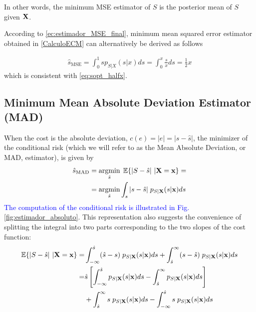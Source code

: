 In other words, the minimum MSE estimator of $S$ is the posterior mean of $S$ given $\bf X$.

\begin{example}
According to \eqref{ec:estimador_MSE_final}, minimum mean squared error estimator obtained in \ref{CalculoECM} can alternatively be derived as follows

\begin{align}
\label{ec:estimador_MSE_final2}
\hat s_{\text{MSE}} = \int_0^1 s p_{S|X}(s|x) ds   
   = \int_0^x \frac{s}{x} ds 
   = \frac{1}{2} x
\end{align}
which is consistent with \eqref{eq:sopt_halfx}.
\end{example}\vspace{0.4cm}



\subsection{Minimum Mean Absolute Deviation Estimator (MAD)}

When the cost is the absolute deviation, $c(e) = |e| = |s - \hat s|$, the minimizer of the conditional risk (which we will refer to as the Mean Absolute Deviation, or MAD, estimator), is given by
\begin{align}
\label{ec:coste_MAD}
\hat{s}_\text{MAD} & = \operatorname*{argmin}_{\hat s}\; \mathbb{E}\{|S - \hat s|~|{\bf X} = {\bf x} \} = \\
	  & = \operatorname*{argmin}_{\hat s}   \int_s |s - \hat s|\;p_{S|{\bf X}}(s|{\bf x}) ds
\end{align}
\textcolor{blue}{The computation of the conditional risk is illustrated in Fig. \ref{fig:estimador_absoluto}}. This representation also suggests the convenience of splitting the integral into two parts corresponding to the two slopes of the cost function:
\begin{align}
\mathbb{E}\{|S - \hat s|~|{\bf X} = {\bf x} \} 
	=& \int_{-\infty}^{\hat s} (\hat s - s) \;p_{S|{\bf X}}(s|{\bf x}) ds
		+ \int_{\hat s}^\infty (s - \hat s) \;p_{S|{\bf X}}(s|{\bf x}) ds \\
	=& \hat s \left[  \int_{-\infty}^{\hat s} p_{S|{\bf X}}(s|{\bf x}) ds 
				    - \int_{\hat s}^{\infty}  p_{S|{\bf X}}(s|{\bf x}) ds \right]  \nonumber\\
	 &  + \int_{\hat s}^{\infty}  s \; p_{S|{\bf X}}(s|{\bf x}) ds 
		- \int_{-\infty}^{\hat s} s \; p_{S|{\bf X}}(s|{\bf x}) ds
\end{align}

